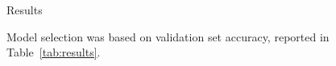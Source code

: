 \documentclass[final]{beamer}
\newlength{\sepwid}
\newlength{\secondcolwid}
\newlength{\thirdcolwid}
\begin{document}
\begin{frame}[t]
\begin{columns}[t]
\begin{column}[t]{\secondcolwid}
\end{column}

\begin{column}{\sepwid}\end{column}

\begin{column}[t]{\thirdcolwid}
	
	\begin{block}{Results}
	

    Model selection was based on validation set accuracy, reported in Table~\ref{tab:results}.
    

\end{block}
\end{column}
\end{columns}
\end{frame}
\end{document}

